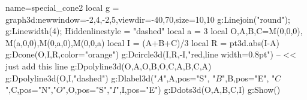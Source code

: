 \documentclass[12pt]{standalone}
\begin{document}
\begin{luadraw}{name=special_cone2}
local g = graph3d:new{window={-2,4,-2,5},viewdir={-40,70},size={10,10}}
g:Linejoin("round"); g:Linewidth(4); Hiddenlinestyle = "dashed"
local a = 3
local O,A,B,C=M(0,0,0), M(a,0,0),M(0,a,0),M(0,0,a)
local I = (A+B+C)/3
local R = pt3d.abs(I-A)
g:Dcone(O,I,R,{color="orange"})
g:Dcircle3d(I,R,-I,"red,line width=0.8pt") -- << just add this line
g:Dpolyline3d({{O,A},{O,B},{O,C},{A,B,C,A}})
g:Dpolyline3d({{O,I}},"dashed")
g:Dlabel3d("$A$",A,{pos="S"}, "$B$",B,{pos="E"}, "$C$",C,{pos="N"},"$O$",O,{pos="S"},"$I$",I,{pos="E"})
g:Ddots3d({O,A,B,C,I})
g:Show()
\end{luadraw}
\end{document}
